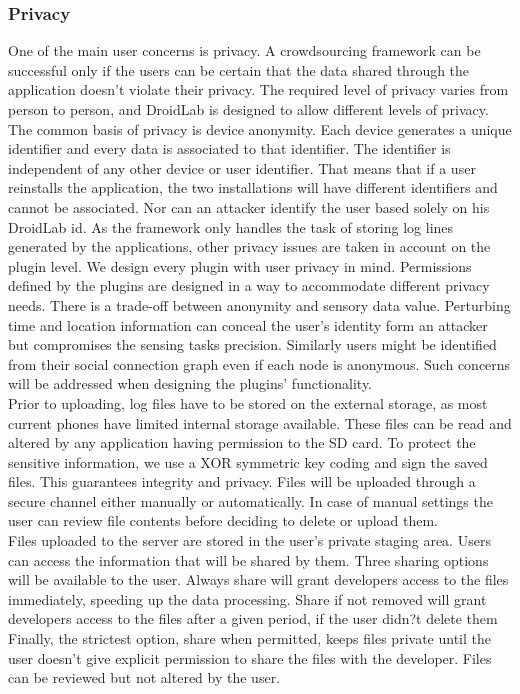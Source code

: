 \documentclass[conference,letterpaper]{IEEEtran}
\begin{document}
\subsubsection{Privacy}
One of the main user concerns is privacy. A crowdsourcing framework can be successful only if the users can be certain that the data shared through the application doesn't violate their privacy. The required level of privacy varies from person to person, and DroidLab is designed to allow different levels of privacy.\\
\indent The common basis of privacy is device anonymity. Each device generates a unique identifier and every data is associated to that identifier. The identifier is independent of any other device or user identifier. That means that if a user reinstalls the application, the two installations will have different identifiers and cannot be associated. Nor can an attacker identify the user based solely on his DroidLab id. As the framework only handles the task of storing log lines generated by the applications, other privacy issues are taken in account on the plugin level. We design every plugin with user privacy in mind. Permissions defined by the plugins are designed in a way to accommodate different privacy needs. There is a trade-off between anonymity and sensory data value. Perturbing time and location information can conceal the user's identity form an attacker but compromises the sensing tasks precision. Similarly users might be identified from their social connection graph even if each node is anonymous. Such concerns will be addressed when designing the plugins' functionality.\\
\indent Prior to uploading, log files have to be stored on the external storage, as most current phones have limited internal storage available. These files can be read and altered by any application having permission to the SD card. To protect the sensitive information, we use a XOR symmetric key coding and sign the saved files. This guarantees integrity and privacy. Files will be uploaded through a secure channel either manually or automatically. In case of manual settings the user can review file contents before deciding to delete or upload them.\\
\indent Files uploaded to the server are stored in the user's private staging area. Users can access the information that will be shared by them. Three sharing options will be available to the user. Always share will grant developers access to the files immediately, speeding up the data processing. Share if not removed will grant developers access to the files after a given period, if the user didn?t delete them Finally, the strictest option, share when permitted, keeps files private until the user doesn't give explicit permission to share the files with the developer. Files can be reviewed but not altered by the user.
\end{document}
